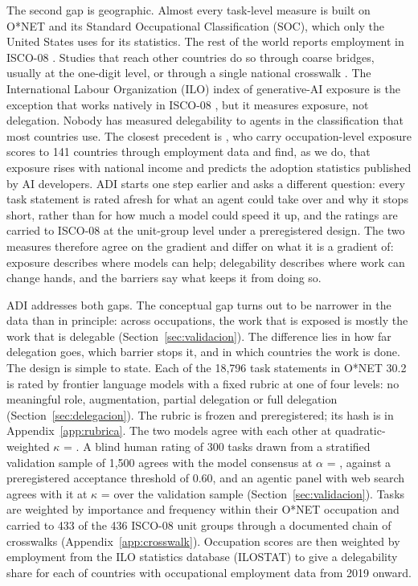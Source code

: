 The second gap is geographic.
Almost every task-level measure is built on O*NET and its Standard Occupational Classification (SOC), which only the United States uses for its statistics.
The rest of the world reports employment in ISCO-08 \citep{ilo2012isco}.
Studies that reach other countries do so through coarse bridges, usually at the one-digit level, or through a single national crosswalk \citep{gmyrek2023generative, pizzinelli2023labor, cazzaniga2024gen, albanesi2023new, chen2023large, murugan2026jagged, carbonero2023impact}.
The International Labour Organization (ILO) index of generative-AI exposure is the exception that works natively in ISCO-08 \citep{gmyrek2025generative}, but it measures exposure, not delegation.
Nobody has measured delegability to agents in the classification that most countries use.
The closest precedent is \citet{murugan2026jagged}, who carry occupation-level exposure scores to 141 countries through employment data and find, as we do, that exposure rises with national income and predicts the adoption statistics published by AI developers.
ADI starts one step earlier and asks a different question: every task statement is rated afresh for what an agent could take over and why it stops short, rather than for how much a model could speed it up, and the ratings are carried to ISCO-08 at the unit-group level under a preregistered design.
The two measures therefore agree on the gradient and differ on what it is a gradient of: exposure describes where models can help; delegability describes where work can change hands, and the barriers say what keeps it from doing so.

ADI addresses both gaps.
The conceptual gap turns out to be narrower in the data than in principle: across occupations, the work that is exposed is mostly the work that is delegable (Section~\ref{sec:validacion}).
The difference lies in how far delegation goes, which barrier stops it, and in which countries the work is done.
The design is simple to state.
Each of the 18,796 task statements in O*NET 30.2 \citep{onet2026database} is rated by frontier language models with a fixed rubric at one of four levels: no meaningful role, augmentation, partial delegation or full delegation (Section~\ref{sec:delegacion}).
The rubric is frozen and preregistered; its hash is in Appendix~\ref{app:rubrica}.
The two models agree with each other at quadratic-weighted $\kappa$ = .
A blind human rating of 300 tasks drawn from a stratified validation sample of 1,500 agrees with the model consensus at $\alpha$ = , against a preregistered acceptance threshold of 0.60, and an agentic panel with web search agrees with it at $\kappa$ =  over the validation sample (Section~\ref{sec:validacion}).
Tasks are weighted by importance and frequency within their O*NET occupation and carried to 433 of the 436 ISCO-08 unit groups through a documented chain of crosswalks (Appendix~\ref{app:crosswalk}).
Occupation scores are then weighted by employment from the ILO statistics database (ILOSTAT) to give a delegability share for each of  countries with occupational employment data from 2019 onward.

